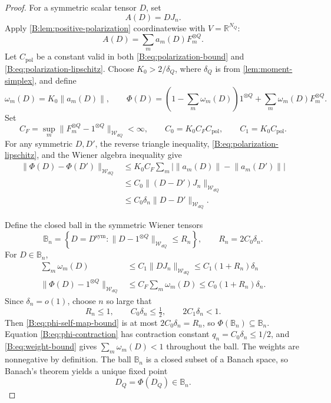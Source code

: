 \documentclass[11pt]{article}
\newcommand{\R}{\mathbb{R}}
\newcommand{\cW}{\mathcal{W}}
\newcommand{\norm}[1]{\lVert #1\rVert}
\newcommand{\abs}[1]{\lvert #1\rvert}
\begin{document}
\begin{proof}
For a symmetric scalar tensor \(D\), set
\[
 A(D)=D J_n.
\]
Apply \cref{B:lem:positive-polarization} coordinatewise with
\(V=\R^{N_Q}\):
\[
 A(D)=\sum_m a_m(D)F_m^{\otimes Q}.
\]
Let \(C_{\mathrm{pol}}\) be a constant valid in both
\eqref{B:eq:polarization-bound} and \eqref{B:eq:polarization-lipschitz}.  Choose
\(K_0>2/\delta_Q\), where \(\delta_Q\) is from
\cref{lem:moment-simplex}, and define
\[
 \omega_m(D)=K_0\norm{a_m(D)},
 \qquad
 \Phi(D)=
 \left(1-\sum_m\omega_m(D)\right)1^{\otimes Q}
 +\sum_m\omega_m(D)F_m^{\otimes Q}.
\]
Set
\[
 C_F=\sup_m
 \norm{F_m^{\otimes Q}-1^{\otimes Q}}_{\cW_{dQ}}<\infty,
 \qquad
 C_0=K_0C_FC_{\mathrm{pol}},
 \qquad
 C_1=K_0C_{\mathrm{pol}}.
\]
For any symmetric \(D,D'\), the reverse triangle inequality,
\eqref{B:eq:polarization-lipschitz}, and the Wiener algebra inequality give
\begin{align}
 \norm{\Phi(D)-\Phi(D')}_{\cW_{dQ}}
 &\le K_0C_F\sum_m
   \abs{\norm{a_m(D)}-\norm{a_m(D')}}\nonumber\\
 &\le C_0\norm{(D-D')J_n}_{\cW_{dQ}}\nonumber\\
 &\le C_0\delta_n\norm{D-D'}_{\cW_{dQ}}.
 \label{B:eq:phi-contraction}
\end{align}

Define the closed ball in the symmetric Wiener tensors
\begin{equation}
 \mathbb B_n
 =\left\{D=D^{\mathrm{sym}}:
   \norm{D-1^{\otimes Q}}_{\cW_{dQ}}\le R_n\right\},
 \qquad
 R_n=2C_0\delta_n.
 \label{B:eq:fixed-point-ball}
\end{equation}
For \(D\in\mathbb B_n\),
\begin{align}
 \sum_m\omega_m(D)
 &\le C_1\norm{DJ_n}_{\cW_{dQ}}
 \le C_1(1+R_n)\delta_n
 \label{B:eq:weight-bound}\\
 \norm{\Phi(D)-1^{\otimes Q}}_{\cW_{dQ}}
 &\le C_F\sum_m\omega_m(D)
 \le C_0(1+R_n)\delta_n.
 \label{B:eq:phi-self-map-bound}
\end{align}
Since \(\delta_n=o(1)\), choose \(n\) so large that
\begin{equation}
 R_n\le1,
 \qquad C_0\delta_n\le\tfrac12,
 \qquad 2C_1\delta_n<1.
 \label{B:eq:fixed-point-smallness}
\end{equation}
Then \eqref{B:eq:phi-self-map-bound} is at most
\(2C_0\delta_n=R_n\), so \(\Phi(\mathbb B_n)\subseteq\mathbb B_n\).
Equation \eqref{B:eq:phi-contraction} has contraction constant
\(q_n=C_0\delta_n\le1/2\), and
\eqref{B:eq:weight-bound} gives \(\sum_m\omega_m(D)<1\) throughout the ball.
The weights are nonnegative by definition.  The ball \(\mathbb B_n\) is a
closed subset of a Banach space, so Banach's theorem yields a unique fixed
point
\begin{equation}
 D_Q=\Phi(D_Q)\in\mathbb B_n.
 \label{B:eq:D-fixed-point}
\end{equation}


\end{proof}
\end{document}
